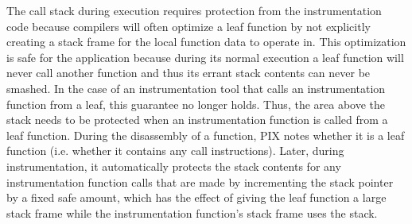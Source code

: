 The call stack during execution requires protection from the instrumentation code because compilers will often optimize a leaf function
by not explicitly creating a stack frame for the local function data to operate in. This optimization is safe for the application because during its
normal execution a leaf function will never call another function and thus its errant stack contents can never be smashed. In the case of an instrumentation
tool that calls an instrumentation function from a leaf, this guarantee no longer holds. Thus, the area above the stack needs to be protected when
an instrumentation function is called from a leaf function. During the disassembly of a function, PIX notes whether it is a leaf function (i.e. whether it contains any call
instructions). Later, during instrumentation, it automatically protects the stack contents for any instrumentation function calls that are made by
incrementing the stack pointer by a fixed safe amount, which has the effect of giving the leaf function a large stack frame while the instrumentation
function's stack frame uses the stack.
